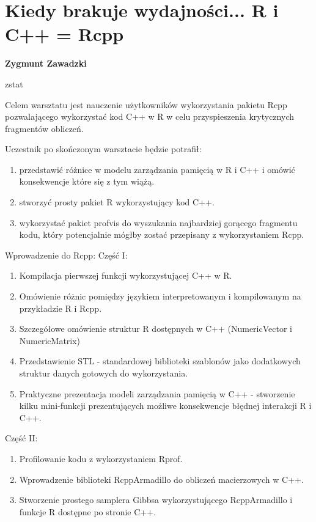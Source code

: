 \documentclass[\main/boa.tex]{subfiles}
\begin{document}
\section{Kiedy brakuje wydajności... R i C++ = Rcpp}

\begin{minipage}{0.915\textwidth}
\centering
{\bf {} Zygmunt Zawadzki}
\end{minipage}

\vskip 0.3cm

\begin{affiliations}
\begin{minipage}{0.915\textwidth}
\centering
\large zstat  \\[2pt]
\end{minipage}
\end{affiliations}

\vskip 0.8cm

\opiswarsztatu Celem warsztatu jest nauczenie użytkowników wykorzystania pakietu Rcpp pozwalającego wykorzystać kod C++ w R w celu przyspieszenia krytycznych fragmentów obliczeń.

Uczestnik po skończonym warsztacie będzie potrafił:
\begin{enumerate}
\item przedstawić różnice w modelu zarządzania pamięcią w R i C++ i omówić konsekwencje które się z tym wiążą.
\item stworzyć prosty pakiet R wykorzystujący kod C++.
\item wykorzystać pakiet profvis do wyszukania najbardziej gorącego fragmentu kodu, który potencjalnie mógłby zostać przepisany z wykorzystaniem Rcpp.
\end{enumerate}

\planwarsztatu 
Wprowadzenie do Rcpp: Część I:
\begin{enumerate}
\item Kompilacja pierwszej funkcji wykorzystującej C++ w R.
\item Omówienie różnic pomiędzy językiem interpretowanym i kompilowanym na przykładzie R i Rcpp.
\item Szczegółowe omówienie struktur R dostępnych w C++ (NumericVector i NumericMatrix)
\item Przedstawienie STL - standardowej biblioteki szablonów jako dodatkowych struktur danych gotowych do wykorzystania.
\item Praktyczne prezentacja modeli zarządzania pamięcią w C++ - stworzenie kilku mini-funkcji prezentujących możliwe konsekwencje błędnej interakcji R i C++.
\end{enumerate}	 
Część II:
\begin{enumerate}
\item Profilowanie kodu z wykorzystaniem Rprof.
\item Wprowadzenie biblioteki RcppArmadillo do obliczeń macierzowych w C++.
\item Stworzenie prostego samplera Gibbsa wykorzystującego RcppArmadillo i funkcje R dostępne po stronie C++.
\end{enumerate}
\end{document}
